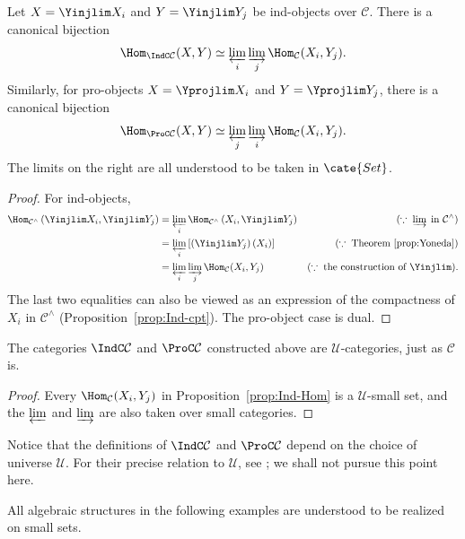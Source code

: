 \begin{proposition}\label{prop:Ind-Hom}
	Let $X=\Yinjlim X_i$ and $Y=\Yinjlim Y_j$ be ind-objects over $\mathcal{C}$. There is a canonical bijection
	\[ \Hom_{\IndC \mathcal{C}}(X, Y) \simeq \varprojlim_i \varinjlim_j \Hom_{\mathcal{C}}(X_i, Y_j). \]
	Similarly, for pro-objects $X=\Yprojlim X_i$ and $Y=\Yprojlim Y_j$, there is a canonical bijection
	\[ \Hom_{\ProC \mathcal{C}}(X, Y) \simeq \varprojlim_j \varinjlim_i \Hom_{\mathcal{C}}(X_i, Y_j). \]
	The limits on the right are all understood to be taken in $\cate{Set}$.
\end{proposition}
\begin{proof}
	For ind-objects,
	\begin{align*}
		\Hom_{\mathcal{C}^\wedge}\left(\Yinjlim X_i, \Yinjlim Y_j \right) & = \varprojlim_i \Hom_{\mathcal{C}^\wedge}\left( X_i, \Yinjlim Y_j \right) & (\because\; \varinjlim \; \text{in $\mathcal{C}^{\wedge}$}) \\
		& = \varprojlim_i \left[ \left( \Yinjlim Y_j \right)(X_i) \right] & (\because\; \text{Theorem \ref{prop:Yoneda}}) \\
		& = \varprojlim_i \varinjlim_j \Hom_{\mathcal{C}}(X_i, Y_j) & (\because\; \text{the construction of }\Yinjlim).
	\end{align*}
	The last two equalities can also be viewed as an expression of the compactness of $X_i$ in $\mathcal{C}^\wedge$ (Proposition~\ref{prop:Ind-cpt}). The pro-object case is dual.
\end{proof}

\begin{corollary}\label{prop:Ind-Pro-size}
	The categories $\IndC\mathcal{C}$ and $\ProC\mathcal{C}$ constructed above are $\mathcal{U}$-categories, just as $\mathcal{C}$ is.
\end{corollary}
\begin{proof}
	Every $\Hom_{\mathcal{C}}(X_i,Y_j)$ in Proposition~\ref{prop:Ind-Hom} is a $\mathcal{U}$-small set, and the $\varprojlim$ and $\varinjlim$ are also taken over small categories.
\end{proof}

Notice that the definitions of $\IndC\mathcal{C}$ and $\ProC\mathcal{C}$ depend on the choice of universe $\mathcal{U}$. For their precise relation to $\mathcal{U}$, see \cite[Proposition 6.1.21]{KS06}; we shall not pursue this point here.

All algebraic structures in the following examples are understood to be realized on small sets.

